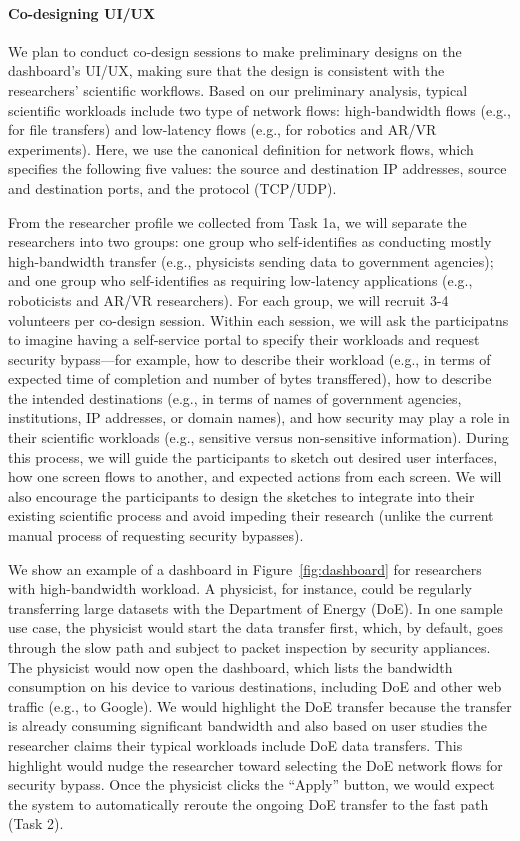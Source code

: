 \paragraph{Co-designing UI/UX}
We plan to conduct co-design sessions to make preliminary designs on the dashboard's UI/UX, making sure that the design is consistent with the researchers' scientific workflows.
Based on our preliminary analysis, typical scientific workloads include two type of network flows: high-bandwidth flows (e.g., for file transfers) and low-latency flows (e.g., for robotics and AR/VR experiments). Here, we use the canonical definition for network flows, which specifies the following five values: the source and destination IP addresses, source and destination ports, and the protocol (TCP/UDP).

From the researcher profile we collected from Task 1a, we will separate the researchers into two groups: one group who self-identifies as conducting mostly high-bandwidth transfer (e.g., physicists sending data to government agencies); and one group who self-identifies as requiring low-latency applications (e.g., roboticists and AR/VR researchers). For each group, we will recruit 3-4 volunteers per co-design session. Within each session, we will ask the participatns to imagine having a self-service portal to specify their workloads and request security bypass---for example, how to describe their workload (e.g., in terms of expected time of completion and number of bytes transffered), how to describe the intended destinations (e.g., in terms of names of government agencies, institutions, IP addresses, or domain names), and how security may play a role in their scientific workloads (e.g., sensitive versus non-sensitive information). During this process, we will guide the participants to sketch out desired user interfaces, how one screen flows to another, and expected actions from each screen.  We will also encourage the participants to design the sketches to integrate into their existing scientific process and avoid impeding their research (unlike the current manual process of requesting security bypasses).

We show an example of a dashboard in Figure~\ref{fig:dashboard} for researchers with high-bandwidth workload. A physicist, for instance, could be regularly transferring large datasets with the Department of Energy (DoE). In one sample use case, the physicist would start the data transfer first, which, by default, goes through the slow path and subject to packet inspection by security appliances. The physicist would now open the dashboard, which lists the bandwidth consumption on his device to various destinations, including DoE and other web traffic (e.g., to Google). We would highlight the DoE transfer because the transfer is already consuming significant bandwidth and also based on user studies the researcher claims their typical workloads include DoE data transfers. This highlight would nudge the researcher toward selecting the DoE network flows for security bypass. Once the physicist clicks the ``Apply'' button, we would expect the system to automatically reroute the ongoing DoE transfer to the fast path (Task 2).


